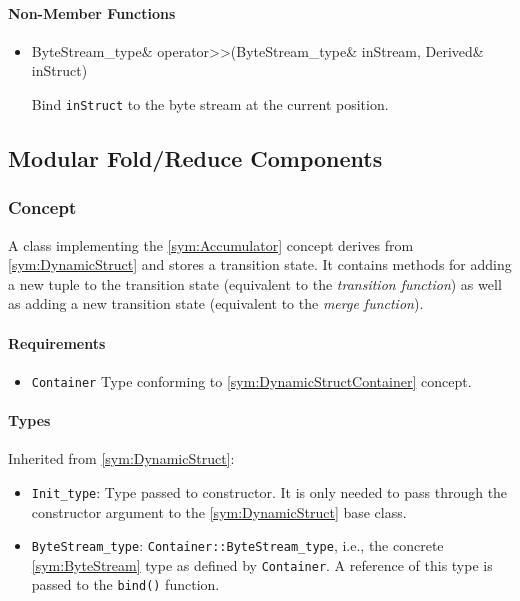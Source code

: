 \paragraph{Non-Member Functions}

\begin{itemize}
	\item
		\begin{cppsnippet}
		ByteStream_type& operator>>(ByteStream_type& inStream, Derived& inStruct)
		\end{cppsnippet}
		
		Bind \texttt{inStruct} to the byte stream at the current position.
\end{itemize}


\subsection{Modular Fold/Reduce Components}

\subsubsection[Concept Accumulator]{Concept }

A class implementing the \ref{sym:Accumulator} concept derives from \ref{sym:DynamicStruct} and stores a transition state. It contains methods for adding a new tuple to the transition state (equivalent to the \emph{transition function}) as well as adding a new transition state (equivalent to the \emph{merge function}).

\paragraph{Requirements}

\begin{itemize}
	\item \texttt{Container} Type conforming to \ref{sym:DynamicStructContainer} concept.
\end{itemize}

\paragraph{Types}

Inherited from \ref{sym:DynamicStruct}:
\begin{itemize}
	\item \texttt{Init\_type}: Type passed to constructor. It is only needed to pass through the constructor argument to the \ref{sym:DynamicStruct} base class.
	\item \texttt{ByteStream\_type}: \texttt{Container::ByteStream\_type}, i.e., the concrete \ref{sym:ByteStream} type as defined by \texttt{Container}. A reference of this type is passed to the \texttt{bind()} function.
\end{itemize}

